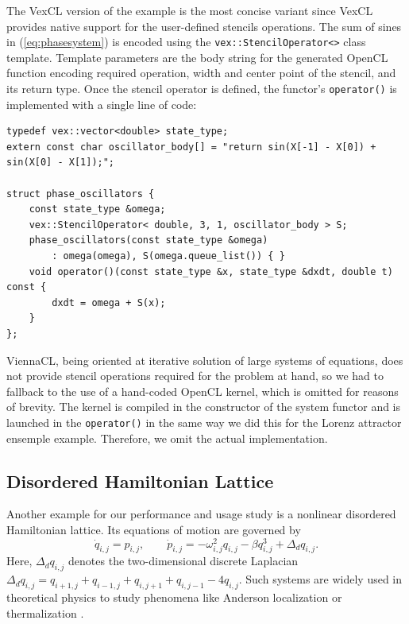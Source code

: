 \documentclass[final]{siamltex}
\newcommand{\code}[1]{\lstinline|#1|}
\newcommand{\eqref}[1]{(\ref{#1})}
\begin{document}
The VexCL version of the example is the most
concise variant since VexCL provides native support for the user-defined
stencils operations. The sum of sines in \eqref{eq:phasesystem} is encoded
using the \code{vex::StencilOperator<>} class template. Template parameters
are the body string for the generated OpenCL function encoding required
operation, width and center point of the stencil, and its return type. Once the
stencil operator is defined, the functor's \code{operator()} is implemented
with a single line of code:
\begin{lstlisting}
typedef vex::vector<double> state_type;
extern const char oscillator_body[] = "return sin(X[-1] - X[0]) + sin(X[0] - X[1]);";

struct phase_oscillators {
    const state_type &omega;
    vex::StencilOperator< double, 3, 1, oscillator_body > S;
    phase_oscillators(const state_type &omega)
        : omega(omega), S(omega.queue_list()) { }
    void operator()(const state_type &x, state_type &dxdt, double t) const {
        dxdt = omega + S(x);
    }
};
\end{lstlisting}


ViennaCL, being oriented at iterative solution of large systems of equations,
does not provide stencil operations required for the problem at hand, so we had
to fallback to the use of a hand-coded OpenCL kernel, which is omitted for
reasons of brevity. The kernel is compiled in the constructor of the system
functor and is launched in the \code{operator()} in the same way we did this
for the Lorenz attractor ensemple example. Therefore, we omit the actual
implementation.




%
%
\subsection{Disordered Hamiltonian Lattice}


Another example for our performance and usage study is a 
nonlinear disordered Hamiltonian lattice\cite{mulansky_scaling_2012}. Its equations of motion are
governed by
\begin{equation}
\dot{q}_{i,j} = p_{i,j}, \quad \quad
\dot{p}_{i,j} = - \omega_{i,j}^2 q_{i,j} - \beta q_{i,j}^3 + \Delta_d q_{i,j}.
\label{eq:disordered_ham}
\end{equation}
Here, $\Delta_d q_{i,j}$ denotes the two-dimensional discrete Laplacian
$\Delta_d
q_{i,j}=q_{i+1,j}+q_{i-1,j}+q_{i,j+1}+q_{i,j-1}-4q_{i,j}$. Such
systems are widely used in theoretical physics to study phenomena
like Anderson localization \cite{Sheng-06} or thermalization \cite{FPUScholarpedia}. 
\end{document}
